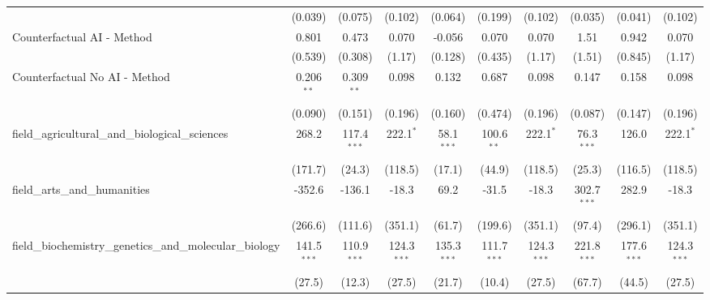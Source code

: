 \begin{tabular}{lccccccccc}
                                                               & (0.039)        & (0.075)         & (0.102)        & (0.064)       & (0.199)       & (0.102)        & (0.035)       & (0.041)         & (0.102)\\   
   Counterfactual AI - Method                                  & 0.801          & 0.473           & 0.070          & -0.056        & 0.070         & 0.070          & 1.51          & 0.942           & 0.070\\   
                                                               & (0.539)        & (0.308)         & (1.17)         & (0.128)       & (0.435)       & (1.17)         & (1.51)        & (0.845)         & (1.17)\\   
   Counterfactual No AI - Method                               & 0.206$^{**}$   & 0.309$^{**}$    & 0.098          & 0.132         & 0.687         & 0.098          & 0.147         & 0.158           & 0.098\\   
                                                               & (0.090)        & (0.151)         & (0.196)        & (0.160)       & (0.474)       & (0.196)        & (0.087)       & (0.147)         & (0.196)\\   
   field\_agricultural\_and\_biological\_sciences              & 268.2          & 117.4$^{***}$   & 222.1$^{*}$    & 58.1$^{***}$  & 100.6$^{**}$  & 222.1$^{*}$    & 76.3$^{***}$  & 126.0           & 222.1$^{*}$\\   
                                                               & (171.7)        & (24.3)          & (118.5)        & (17.1)        & (44.9)        & (118.5)        & (25.3)        & (116.5)         & (118.5)\\   
   field\_arts\_and\_humanities                                & -352.6         & -136.1          & -18.3          & 69.2          & -31.5         & -18.3          & 302.7$^{***}$ & 282.9           & -18.3\\   
                                                               & (266.6)        & (111.6)         & (351.1)        & (61.7)        & (199.6)       & (351.1)        & (97.4)        & (296.1)         & (351.1)\\   
   field\_biochemistry\_genetics\_and\_molecular\_biology      & 141.5$^{***}$  & 110.9$^{***}$   & 124.3$^{***}$  & 135.3$^{***}$ & 111.7$^{***}$ & 124.3$^{***}$  & 221.8$^{***}$ & 177.6$^{***}$   & 124.3$^{***}$\\   
                                                               & (27.5)         & (12.3)          & (27.5)         & (21.7)        & (10.4)        & (27.5)         & (67.7)        & (44.5)          & (27.5)\\   

\end{tabular}

